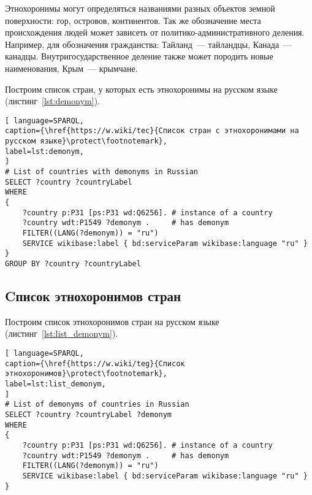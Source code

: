 Этнохоронимы могут определяться названиями разных объектов земной поверхности: гор, островов, континентов. Так же обозначение места происхождения людей может зависеть от политико-административного деления. Например, для обозначения гражданства: Тайланд~--- тайландцы, Канада~--- канадцы. Внутригосударственное деление также может породить новые наименования, Крым~--- крымчане.

Построим список стран, у которых есть этнохоронимы на русском языке (листинг~\ref{lst:demonym}).


\begin{lstlisting}[ language=SPARQL, 
caption={\href{https://w.wiki/tec}{Список стран с этнохоронимами на русском языке}\protect\footnotemark},
label=lst:demonym, 
]
# List of countries with demonyms in Russian
SELECT ?country ?countryLabel 
WHERE
{
	?country p:P31 [ps:P31 wd:Q6256]. # instance of a country
	?country wdt:P1549 ?demonym .     # has demonym
	FILTER((LANG(?demonym)) = "ru")
	SERVICE wikibase:label { bd:serviceParam wikibase:language "ru" }
}
GROUP BY ?country ?countryLabel
\end{lstlisting}



\subsection{Cписок этнохоронимов стран}


Построим список этнохоронимов стран на русском языке (листинг~\ref{lst:list_demonym}).

\begin{lstlisting}[ language=SPARQL, 
caption={\href{https://w.wiki/teg}{Cписок этнохоронимов}\protect\footnotemark},
label=lst:list_demonym, 
]
# List of demonyms of countries in Russian
SELECT ?country ?countryLabel ?demonym
WHERE
{
	?country p:P31 [ps:P31 wd:Q6256]. # instance of a country
	?country wdt:P1549 ?demonym .     # has demonym
	FILTER((LANG(?demonym)) = "ru")
	SERVICE wikibase:label { bd:serviceParam wikibase:language "ru" }
}
\end{lstlisting}

